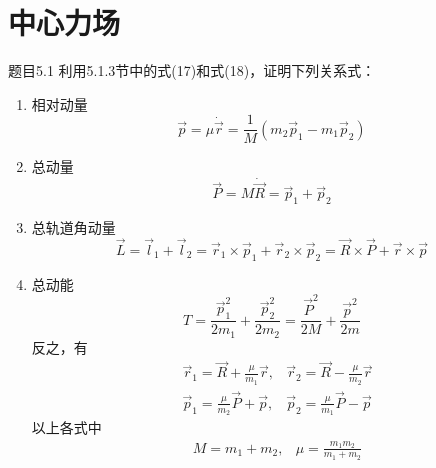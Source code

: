 \section{中心力场}

\begin{question}{题目5.1}
    利用5.1.3节中的式(17)和式(18)，证明下列关系式：
    \begin{enumerate}
        \item 相对动量
              $$
                  \vec{p}=\mu\dot{\vec{r}}=\frac{1}{M}\left(m_2\vec{p}_1-m_1\vec{p}_2\right)
              $$
        \item 总动量
              $$
                  \vec{P}=M\dot{\vec{R}} = \vec{p}_1+\vec{p}_2
              $$
        \item 总轨道角动量
              $$
                  \vec{L}=\vec{l}_1+\vec{l}_2
                  =\vec{r}_1\times\vec{p}_1+\vec{r}_2\times\vec{p}_2
                  =\vec{R}\times\vec{P}+\vec{r}\times\vec{p}
              $$
        \item 总动能
              $$
                  T=\frac{\vec{p}_1^2}{2m_1}+\frac{\vec{p}_2^2}{2m_2}
                  =\frac{\vec{P}^2}{2M}+\frac{\vec{p}^2}{2m}
              $$
              反之，有
              $$
                  \begin{aligned}
                       & \vec{r}_1=\vec{R}+\frac{\mu}{m_1}\vec{r},   & \vec{r}_2=\vec{R}-\frac{\mu}{m_2}\vec{r} \\
                       & \vec{p}_1 = \frac{\mu}{m_2}\vec{P}+\vec{p}, & \vec{p}_2=\frac{\mu}{m_1}\vec{P}-\vec{p}
                  \end{aligned}
              $$
              以上各式中
              $$
                  \begin{aligned}
                       & M=m_1+m_2, & \mu=\frac{m_1m_2}{m_1+m_2}
                  \end{aligned}
              $$
    \end{enumerate}
\end{question}
